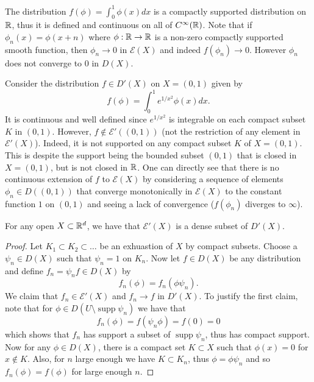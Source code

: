 \documentclass[twoside, a4paper, 10pt]{amsart}
\begin{document}
\begin{eg} The distribution $f(\phi) = \int_{0}^1 \phi(x) dx $ is a compactly supported distribution on $\mathbb{R}$, thus it is defined and continuous on all of $C^{\infty}(\mathbb{R})$. Note that if $\phi_n(x) = \phi(x+n)$ where $\phi:\mathbb{R} \to \mathbb{R}$ is a non-zero compactly supported smooth function, then $\phi_n \to 0$ in $\mathcal{E}(X)$ and indeed $f(\phi_n) \to 0$. However $\phi_n$ does not converge to $0$ in $D(X)$.

\end{eg}

\begin{eg} Consider the distribution $f \in D'(X)$ on $X=(0,1)$ given by $$f(\phi) = \int_{0}^1 e^{1/x^2} \phi(x) dx.$$ It is continuous and well defined since $e^{1/x^2}$ is integrable on each compact subset $K$ in $(0,1)$. However, $f \notin \mathcal{E}'((0,1))$ (not the restriction of any element in $\mathcal{E}'(X)$). Indeed, it is not supported on any compact subset $K$ of $X=(0,1)$. This is despite the support being the bounded subset $(0,1)$ that is closed in $X=(0,1)$, but is not closed in $\mathbb{R}$. One can directly see that there is no continuous extension of $f$ to $\mathcal{E}(X)$ by considering a sequence of elements $\phi_n \in D((0,1))$ that converge monotonically in $\mathcal{E}(X)$ to the constant function $1$ on $(0,1)$ and seeing a lack of convergence ($f(\phi_n)$ diverges to $\infty$).

\end{eg}

\begin{thm} For any open $X \subset \mathbb{R}^d$, we have that $\mathcal{E}'(X)$ is a dense subset of $D'(X)$.

\end{thm}

\begin{proof} Let $K_1 \subset K_2 \subset \ldots $ be an exhuastion of $X$ by compact subsets. Choose a $\psi_n \in D(X)$ such that $\psi_n = 1$ on $K_n$. Now let $f \in D(X)$ be any distribution and define $f_n = \psi_n f \in D(X)$ by $$f_n(\phi) = f_n(\phi \psi_n).$$ We claim that $f_n \in \mathcal{E}'(X)$ and $f_n \to f$ in $D'(X)$. To justify the first claim, note that for $\phi \in D(U \setminus \operatorname{supp} \psi_n)$ we have that $$f_n(\phi) = f(\psi_n \phi) = f(0) = 0$$ which shows that $f_n$ has support a subset of $\operatorname{supp} \psi_n$, thus has compact support. Now for any $\phi \in D(X)$, there is a compact set $K \subset X$ such that $\phi(x) = 0$ for $x \notin K$. Also, for $n$ large enough we have $K \subset K_n$, thus $\phi = \phi \psi_n$ and so $f_n(\phi) = f(\phi)$ for large enough $n$. \end{proof}
\end{document}
